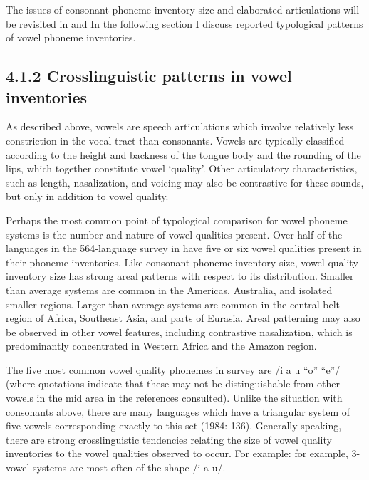   The issues of consonant phoneme inventory size and elaborated articulations will be revisited in  and  In the following section I discuss reported typological patterns of vowel phoneme inventories.


\subsection{4.1.2 Crosslinguistic patterns in vowel inventories}

  As described above, vowels are speech articulations which involve relatively less constriction in the vocal tract than consonants. Vowels are typically classified according to the height and backness of the tongue body and the rounding of the lips, which together constitute vowel ‘quality’. Other articulatory characteristics, such as length, nasalization, and voicing may also be contrastive for these sounds, but only in addition to vowel quality.



  Perhaps the most common point of typological comparison for vowel phoneme systems is the number and nature of vowel qualities present. Over half of the languages in the 564-language survey in \citet{Maddieson2013c} have five or six vowel qualities present in their phoneme inventories. Like consonant phoneme inventory size, vowel quality inventory size has strong areal patterns with respect to its distribution. Smaller than average systems are common in the Americas, Australia, and isolated smaller regions. Larger than average systems are common in the central belt region of Africa, Southeast Asia, and parts of Eurasia. Areal patterning may also be observed in other vowel features, including contrastive nasalization, which is predominantly concentrated in Western Africa and the Amazon region.



  The five most common vowel quality phonemes in  survey are /i a u “o” “e”/ (where quotations indicate that these may not be distinguishable from other vowels in the mid area in the references consulted). Unlike the situation with consonants above, there are many languages which have a triangular system of five vowels corresponding exactly to this set (1984: 136). Generally speaking, there are strong crosslinguistic tendencies relating the size of vowel quality inventories to the vowel qualities observed to occur. For example: for example, 3-vowel systems are most often of the shape /i a u/. 



